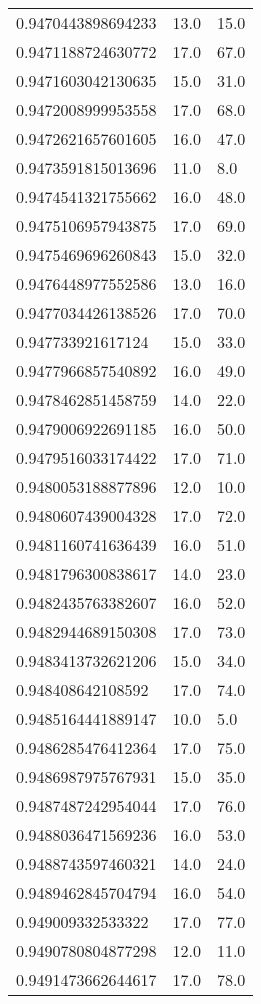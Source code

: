 \begin{center}
\begin{supertabular}[H]{p{0.30\textwidth}p{0.05\textwidth}p{0.05\textwidth}}
0.9470443898694233 & 13.0 & 15.0 \\ 
0.9471188724630772 & 17.0 & 67.0 \\ 
0.9471603042130635 & 15.0 & 31.0 \\ 
0.9472008999953558 & 17.0 & 68.0 \\ 
0.9472621657601605 & 16.0 & 47.0 \\ 
0.9473591815013696 & 11.0 & 8.0 \\ 
0.9474541321755662 & 16.0 & 48.0 \\ 
0.9475106957943875 & 17.0 & 69.0 \\ 
0.9475469696260843 & 15.0 & 32.0 \\ 
0.9476448977552586 & 13.0 & 16.0 \\ 
0.9477034426138526 & 17.0 & 70.0 \\ 
0.947733921617124 & 15.0 & 33.0 \\ 
0.9477966857540892 & 16.0 & 49.0 \\ 
0.9478462851458759 & 14.0 & 22.0 \\ 
0.9479006922691185 & 16.0 & 50.0 \\ 
0.9479516033174422 & 17.0 & 71.0 \\ 
0.9480053188877896 & 12.0 & 10.0 \\ 
0.9480607439004328 & 17.0 & 72.0 \\ 
0.9481160741636439 & 16.0 & 51.0 \\ 
0.9481796300838617 & 14.0 & 23.0 \\ 
0.9482435763382607 & 16.0 & 52.0 \\ 
0.9482944689150308 & 17.0 & 73.0 \\ 
0.9483413732621206 & 15.0 & 34.0 \\ 
0.948408642108592 & 17.0 & 74.0 \\ 
0.9485164441889147 & 10.0 & 5.0 \\ 
0.9486285476412364 & 17.0 & 75.0 \\ 
0.9486987975767931 & 15.0 & 35.0 \\ 
0.9487487242954044 & 17.0 & 76.0 \\ 
0.9488036471569236 & 16.0 & 53.0 \\ 
0.9488743597460321 & 14.0 & 24.0 \\ 
0.9489462845704794 & 16.0 & 54.0 \\ 
0.949009332533322 & 17.0 & 77.0 \\ 
0.9490780804877298 & 12.0 & 11.0 \\ 
0.9491473662644617 & 17.0 & 78.0 \\ 

\end{supertabular}
\end{center}
